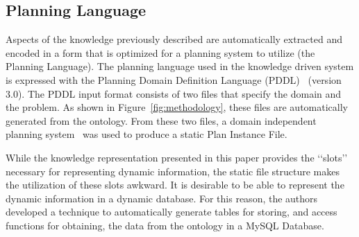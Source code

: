 

\subsection{Planning Language}
\label{subsection:planning_language}
Aspects of the knowledge previously described are automatically extracted and encoded in a form that is optimized for a planning system to utilize (the Planning Language). The planning language used in the knowledge driven system is expressed with the Planning Domain Definition Language (PDDL)~\cite{PDDL} (version 3.0). The PDDL input format consists of two files that specify the domain and the problem. As shown in Figure~\ref{fig:methodology}, these files are automatically generated from the ontology. From these two files, a domain independent planning system~\cite{Coles.ICAPS.2010} was used to produce a static \textsf{Plan Instance File}.



While the knowledge representation presented in this paper provides the \lq\lq{}slots\rq\rq{} necessary for representing dynamic information, the
static file structure makes the utilization of these slots awkward. It is desirable to be able to represent the dynamic information in a dynamic database.
For this reason, the authors developed a technique to automatically generate tables for storing, and access functions
for obtaining, the data from the ontology in a \textsf{MySQL Database}.

